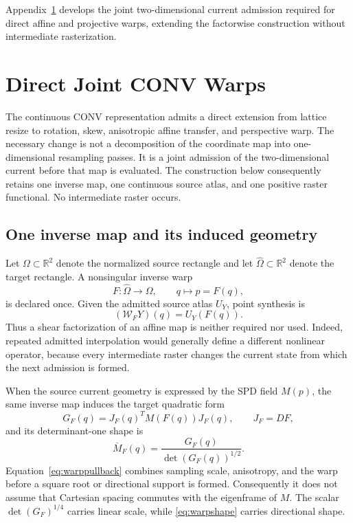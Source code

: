 \documentclass[journal]{IEEEtran}
\newcommand{\R}{\mathbb{R}}
\begin{document}
Appendix~\ref{app:directwarp} develops the joint two-dimensional current
admission required for direct affine and projective warps, extending the
factorwise construction without intermediate rasterization.

\providecommand{\WarpFigureRoot}{conv_paper_assets}
\appendices
\section{Direct Joint CONV Warps}
\label{app:directwarp}

The continuous CONV representation admits a direct extension from lattice
resize to rotation, skew, anisotropic affine transfer, and perspective warp.
The necessary change is not a decomposition of the coordinate map into
one-dimensional resampling passes.  It is a joint admission of the
two-dimensional current before that map is evaluated.  The construction
below consequently retains one inverse map, one continuous source atlas, and
one positive raster functional.  No intermediate raster occurs.

\subsection{One inverse map and its induced geometry}

Let \(\Omega\subset\R^2\) denote the normalized source rectangle and let
\(\widehat\Omega\subset\R^2\) denote the target rectangle.  A nonsingular
inverse warp
\begin{equation}
 F:\widehat\Omega\longrightarrow\Omega,\qquad q\longmapsto p=F(q),
 \label{eq:warpmap}
\end{equation}
is declared once.  Given the admitted source atlas \(U_Y\), point synthesis is
\begin{equation}
 (\mathcal W_FY)(q)=U_Y(F(q)).
 \label{eq:warppoint}
\end{equation}
Thus a shear factorization of an affine map is neither required nor used.
Indeed, repeated admitted interpolation would generally define a different
nonlinear operator, because every intermediate raster changes the current
state from which the next admission is formed.

When the source current geometry is expressed by the SPD field \(M(p)\), the
same inverse map induces the target quadratic form
\begin{equation}
 G_F(q)=J_F(q)^TM(F(q))J_F(q),
 \qquad J_F=DF,
 \label{eq:warppullback}
\end{equation}
and its determinant-one shape is
\begin{equation}
 \overline M_F(q)=\frac{G_F(q)}{\det(G_F(q))^{1/2}}.
 \label{eq:warpshape}
\end{equation}
Equation~\eqref{eq:warppullback} combines sampling scale, anisotropy, and the
warp before a square root or directional support is formed.  Consequently it
does not assume that Cartesian spacing commutes with the eigenframe of
\(M\).  The scalar \(\det(G_F)^{1/4}\) carries linear scale, while
\eqref{eq:warpshape} carries directional shape.
\end{document}

